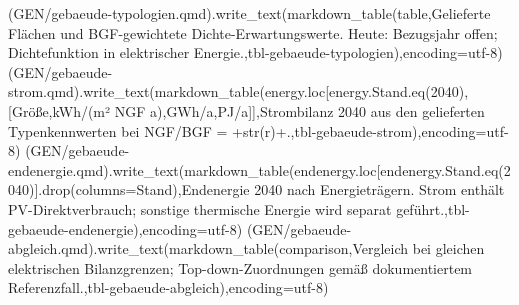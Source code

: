\documentclass[
  ngerman,
  a4paper,
  DIV=11]{scrreprt}
\newenvironment{Shaded}{\begin{snugshade}}{\end{snugshade}}
\newcommand{\BuiltInTok}[1]{\textcolor[rgb]{0.00,0.23,0.31}{#1}}
\newcommand{\NormalTok}[1]{\textcolor[rgb]{0.00,0.23,0.31}{#1}}
\newcommand{\OperatorTok}[1]{\textcolor[rgb]{0.37,0.37,0.37}{#1}}
\newcommand{\StringTok}[1]{\textcolor[rgb]{0.13,0.47,0.30}{#1}}
\begin{document}
\begin{Shaded}
\begin{Highlighting}[]
\NormalTok{(GEN}\OperatorTok{/}\StringTok{\textquotesingle{}gebaeude{-}typologien.qmd\textquotesingle{}}\NormalTok{).write\_text(markdown\_table(table,}\StringTok{\textquotesingle{}Gelieferte Flächen und BGF{-}gewichtete Dichte{-}Erwartungswerte. Heute: Bezugsjahr offen; Dichtefunktion in elektrischer Energie.\textquotesingle{}}\NormalTok{,}\StringTok{\textquotesingle{}tbl{-}gebaeude{-}typologien\textquotesingle{}}\NormalTok{),encoding}\OperatorTok{=}\StringTok{\textquotesingle{}utf{-}8\textquotesingle{}}\NormalTok{)}
\NormalTok{(GEN}\OperatorTok{/}\StringTok{\textquotesingle{}gebaeude{-}strom.qmd\textquotesingle{}}\NormalTok{).write\_text(markdown\_table(energy.loc[energy.Stand.eq(}\StringTok{\textquotesingle{}2040\textquotesingle{}}\NormalTok{),[}\StringTok{\textquotesingle{}Größe\textquotesingle{}}\NormalTok{,}\StringTok{\textquotesingle{}kWh/(m² NGF a)\textquotesingle{}}\NormalTok{,}\StringTok{\textquotesingle{}GWh/a\textquotesingle{}}\NormalTok{,}\StringTok{\textquotesingle{}PJ/a\textquotesingle{}}\NormalTok{]],}\StringTok{\textquotesingle{}Strombilanz 2040 aus den gelieferten Typenkennwerten bei NGF/BGF = \textquotesingle{}}\OperatorTok{+}\BuiltInTok{str}\NormalTok{(r)}\OperatorTok{+}\StringTok{\textquotesingle{}.\textquotesingle{}}\NormalTok{,}\StringTok{\textquotesingle{}tbl{-}gebaeude{-}strom\textquotesingle{}}\NormalTok{),encoding}\OperatorTok{=}\StringTok{\textquotesingle{}utf{-}8\textquotesingle{}}\NormalTok{)}
\NormalTok{(GEN}\OperatorTok{/}\StringTok{\textquotesingle{}gebaeude{-}endenergie.qmd\textquotesingle{}}\NormalTok{).write\_text(markdown\_table(endenergy.loc[endenergy.Stand.eq(}\StringTok{\textquotesingle{}2040\textquotesingle{}}\NormalTok{)].drop(columns}\OperatorTok{=}\StringTok{\textquotesingle{}Stand\textquotesingle{}}\NormalTok{),}\StringTok{\textquotesingle{}Endenergie 2040 nach Energieträgern. Strom enthält PV{-}Direktverbrauch; sonstige thermische Energie wird separat geführt.\textquotesingle{}}\NormalTok{,}\StringTok{\textquotesingle{}tbl{-}gebaeude{-}endenergie\textquotesingle{}}\NormalTok{),encoding}\OperatorTok{=}\StringTok{\textquotesingle{}utf{-}8\textquotesingle{}}\NormalTok{)}
\NormalTok{(GEN}\OperatorTok{/}\StringTok{\textquotesingle{}gebaeude{-}abgleich.qmd\textquotesingle{}}\NormalTok{).write\_text(markdown\_table(comparison,}\StringTok{\textquotesingle{}Vergleich bei gleichen elektrischen Bilanzgrenzen; Top{-}down{-}Zuordnungen gemäß dokumentiertem Referenzfall.\textquotesingle{}}\NormalTok{,}\StringTok{\textquotesingle{}tbl{-}gebaeude{-}abgleich\textquotesingle{}}\NormalTok{),encoding}\OperatorTok{=}\StringTok{\textquotesingle{}utf{-}8\textquotesingle{}}\NormalTok{)}

\end{Highlighting}
\end{Shaded}
\end{document}
